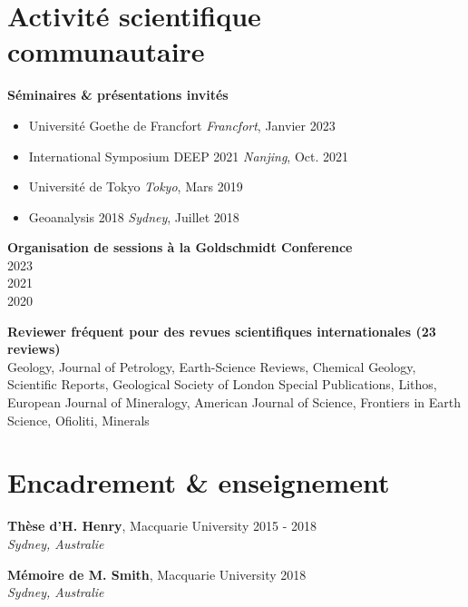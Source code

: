 \documentclass[a4paper,11pt]{article}
\begin{document}
\section{Activité scientifique communautaire}

    \textbf{Séminaires \& présentations invités}
    \begin{itemize}[label={},itemsep=0pt,parsep=0pt]
        \item Université Goethe de Francfort
            \hfill \textit{Francfort}, {Janvier 2023}
        \item International Symposium DEEP 2021
            \hfill \textit{Nanjing}, {Oct. 2021}
        \item Université de Tokyo
            \hfill \textit{Tokyo}, {Mars 2019}
        \item Geoanalysis 2018
            \hfill \textit{Sydney}, {Juillet 2018}
    \end{itemize}

    \textbf{Organisation de sessions à la Goldschmidt Conference}\\
     \hfill {2023}\\
     \hfill {2021} \\
     \hfill {2020}
    
    \textbf{Reviewer fréquent pour des revues scientifiques internationales (23 reviews)}\\
      Geology, Journal of Petrology, Earth-Science Reviews, Chemical Geology, Scientific Reports, Geological Society of London Special Publications, Lithos, European Journal of Mineralogy, American Journal of Science, Frontiers in Earth Science, Ofioliti, Minerals

\section{Encadrement \& enseignement}
    \textbf{Thèse d'H. Henry}, Macquarie University
    \hfill {2015 - 2018}\\ 
    \hfill \textit{Sydney, Australie}

    \textbf{Mémoire de M. Smith}, Macquarie University
    \hfill {2018}\\ 
    \hfill \textit{Sydney, Australie}
\end{document}
